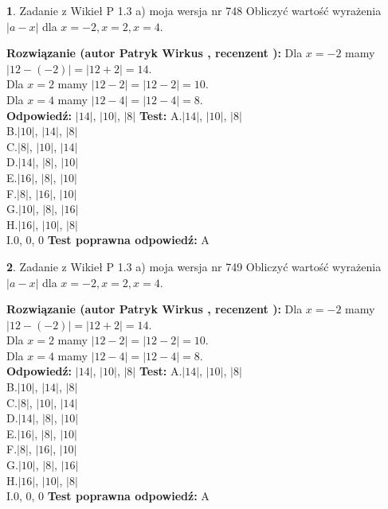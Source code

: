 \documentclass[12pt, a4paper]{article}
\theoremstyle{definition} %
\newtheorem{zad}{}
\newcommand{\zadStart}[1]{\begin{zad}#1\newline}
\newcommand{\zadStop}{\end{zad}}
\newcommand{\rozwStart}[2]{\noindent \textbf{Rozwiązanie (autor #1 , recenzent #2): }\newline}
\newcommand{\rozwStop}{\newline}
\newcommand{\odpStart}{\noindent \textbf{Odpowiedź:}\newline}
\newcommand{\odpStop}{\newline}
\newcommand{\testStart}{\noindent \textbf{Test:}\newline}
\newcommand{\testStop}{\newline}
\newcommand{\kluczStart}{\noindent \textbf{Test poprawna odpowiedź:}\newline}
\newcommand{\kluczStop}{\newline}
\begin{document}
\zadStart{Zadanie z Wikieł P 1.3 a) moja wersja nr 748}
Obliczyć wartość wyrażenia $|a - x|$ dla $x=-2,x=2,x=4$.
\zadStop
\rozwStart{Patryk Wirkus}{}
Dla $x = -2$ mamy $|12 - (-2)| = |12 + 2| = 14$.\\
Dla $x = 2$ mamy $|12 - 2| = |12 - 2| = 10$.\\
Dla $x = 4$ mamy $|12 - 4| = |12 - 4| = 8$.\\
\rozwStop
\odpStart
$|14|$, $|10|$, $|8|$
\odpStop
\testStart
A.$|14|$, $|10|$, $|8|$\\
B.$|10|$, $|14|$, $|8|$\\
C.$|8|$, $|10|$, $|14|$\\
D.$|14|$, $|8|$, $|10|$\\
E.$|16|$, $|8|$, $|10|$\\
F.$|8|$, $|16|$, $|10|$\\
G.$|10|$, $|8|$, $|16|$\\
H.$|16|$, $|10|$, $|8|$\\
I.$0$, $0$, $0$
\testStop
\kluczStart
A
\kluczStop



\zadStart{Zadanie z Wikieł P 1.3 a) moja wersja nr 749}
Obliczyć wartość wyrażenia $|a - x|$ dla $x=-2,x=2,x=4$.
\zadStop
\rozwStart{Patryk Wirkus}{}
Dla $x = -2$ mamy $|12 - (-2)| = |12 + 2| = 14$.\\
Dla $x = 2$ mamy $|12 - 2| = |12 - 2| = 10$.\\
Dla $x = 4$ mamy $|12 - 4| = |12 - 4| = 8$.\\
\rozwStop
\odpStart
$|14|$, $|10|$, $|8|$
\odpStop
\testStart
A.$|14|$, $|10|$, $|8|$\\
B.$|10|$, $|14|$, $|8|$\\
C.$|8|$, $|10|$, $|14|$\\
D.$|14|$, $|8|$, $|10|$\\
E.$|16|$, $|8|$, $|10|$\\
F.$|8|$, $|16|$, $|10|$\\
G.$|10|$, $|8|$, $|16|$\\
H.$|16|$, $|10|$, $|8|$\\
I.$0$, $0$, $0$
\testStop
\kluczStart
A
\kluczStop
\end{document}
